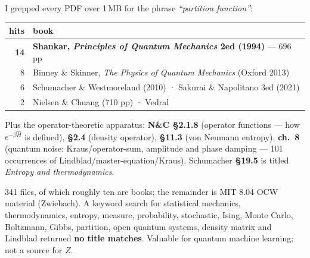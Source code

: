 \begin{haveit}[title={2 · \bk{TensoQi101} --- the quantum half, complete}]
I grepped every PDF over 1\,MB for the phrase \emph{``partition function''}:
\begin{center}\small
\begin{tabular}{@{}rl@{}}
\toprule
\rowcolor{tenso!14}
\textbf{hits} & \textbf{book}\\
\midrule
\textbf{14} & \textbf{Shankar, \textit{Principles of Quantum Mechanics} 2ed (1994)} --- 696 pp\\
8 & Binney \& Skinner, \textit{The Physics of Quantum Mechanics} (Oxford 2013)\\
6 & Schumacher \& Westmoreland (2010) · Sakurai \& Napolitano 3ed (2021)\\
2 & Nielsen \& Chuang (710 pp) · Vedral\\
\bottomrule
\end{tabular}
\end{center}
\vspace{2pt}
Plus the operator-theoretic apparatus: \textbf{N\&C §2.1.8} (operator functions --- how $e^{-\beta\hat H}$
is defined), \textbf{§2.4} (density operator), \textbf{§11.3} (von Neumann entropy), \textbf{ch.~8}
(quantum noise: Kraus/operator-sum, amplitude and phase damping --- 101 occurrences of
Lindblad/master-equation/Kraus). Schumacher \textbf{§19.5} is titled \emph{Entropy and thermodynamics}.
\end{haveit}

\begin{warmbox}[title={3 · \bk{qm-qi-qml} --- large, but not for this}]
341 files, of which roughly ten are books; the remainder is MIT 8.04 OCW material (Zwiebach). A
keyword search for statistical mechanics, thermodynamics, entropy, measure, probability, stochastic,
Ising, Monte Carlo, Boltzmann, Gibbs, partition, open quantum systems, density matrix and Lindblad
returned \textbf{no title matches}. Valuable for quantum machine learning; not a source for $Z$.
\end{warmbox}

